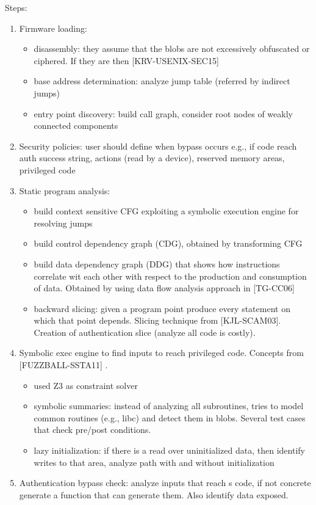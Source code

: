 Steps:
\begin{enumerate}
  \item Firmware loading: 
    \begin{itemize}
      \item disassembly: they assume that the blobs are not excessively obfuscated or ciphered. If they are then [KRV-USENIX-SEC15]
      \item base address determination: analyze jump table (referred by indirect jumps)
      \item entry point discovery: build call graph, consider root nodes of weakly connected components
    \end{itemize}
  \item Security policies: user should define when bypass occurs e.g., if code reach auth success string, actions (read by a device), reserved memory areas, privileged code
  \item Static program analysis:
    \begin{itemize}
      \item build context sensitive CFG exploiting a symbolic execution engine for resolving jumps
      \item build control dependency graph (CDG), obtained by transforming CFG
      \item build data dependency graph (DDG) that shows how instructions correlate wit each other with respect to the production and consumption of data. Obtained by using data flow analysis approach in [TG-CC06]
      \item backward slicing: given a program point produce every statement on which that point depends. Slicing technique from [KJL-SCAM03]. Creation of authentication slice (analyze all code is costly).
    \end{itemize}
  \item Symbolic exec engine to find inputs to reach privileged code. Concepts from~\cite{KLEE-OSDI08} [FUZZBALL-SSTA11] \cite{MAYHEM-SP12}.
    \begin{itemize}
      \item used Z3 as constraint solver
      \item symbolic summaries: instead of analyzing all subroutines, tries to model common routines (e.g., libc) and detect them in blobs. Several test cases that check pre/post conditions.
      \item lazy initialization: if there is a read over uninitialized data, then identify writes to that area, analyze path with and without initialization
    \end{itemize}
  \item  Authentication bypass check: analyze inputs that reach s code, if not concrete generate a function that can generate them. Also identify data exposed.
\end{enumerate}


